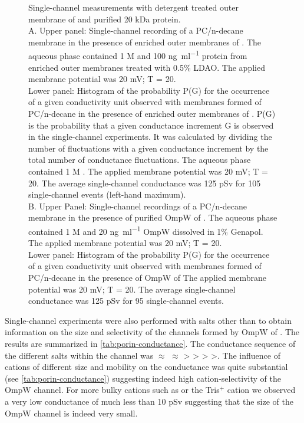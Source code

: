 \begin{figure}[htb]
  	\begin{center}
   	\end{center}
   	\caption[Single-channel measurements with detergent treated outer membrane of C. crescentus and purified 20 kDa protein]{
Single-channel measurements with detergent treated outer membrane of \caulobacter and purified 20 kDa protein.\\
A. Upper panel: Single-channel recording of a PC/n-decane membrane in the presence of enriched outer membranes of \caulobacter. The aqueous phase contained 1 M  and 100 \si{\nano\gram\per\milli\litre} protein from enriched outer membranes treated with 0.5\% \ac{LDAO}. The applied membrane potential was 20 \si{\milli\volt}; T = 20\cel.\\
Lower panel: Histogram of the probability P(G) for the occurrence of a given conductivity unit observed with membranes formed of \ac{PC}/n-decane in the presence of enriched outer membranes of \caulobacter. P(G) is the probability that a given conductance increment G is observed in the single-channel experiments. It was calculated by dividing the number of fluctuations with a given conductance increment by the total number of conductance fluctuations. The aqueous phase contained 1 M . The applied membrane potential was 20 \si{\milli\volt}; T = 20\cel. The average single-channel conductance was 125 \si{\pico\sievert} for 105 single-channel events (left-hand maximum). \\
B. Upper Panel: Single-channel recordings of a \ac{PC}/n-decane membrane in the presence of purified OmpW of \caulobacter. The aqueous phase contained 1 M  and 20 \si{\nano\gram\per\milli\litre} OmpW dissolved in 1\% Genapol. The applied membrane potential was 20 \si{\milli\volt}; T = 20\cel. \\
Lower panel: Histogram of the probability P(G) for the occurrence of a given conductivity unit observed with membranes formed of \ac{PC}/n-decane in the presence of OmpW of \caulobacter The applied membrane potential was 20 \si{\milli\volt}; T = 20\cel. The average single-channel conductance was 125 \si{\pico\sievert} for 95 single-channel events.
   	}
   	\label{fig:porin-20ksinglechannel}
\end{figure}   

Single-channel experiments were also performed with salts other than  to obtain information on the size and selectivity of the channels formed by OmpW of \caulobacter. The results are summarized in \cref{tab:porin-conductance}. The conductance sequence of the different salts within the channel was  $\approx$  $\approx$  \textgreater {} \textgreater {} \textgreater {} \textgreater {}. The influence of cations of different size and mobility on the conductance was quite substantial (see \cref{tab:porin-conductance}) suggesting indeed high cation-selectivity of the OmpW channel. For more bulky cations such as  or the Tris$^+$ cation we observed a very low conductance of much less than 10 \si{\pico\sievert} suggesting that the size of the OmpW channel is indeed very small. 

